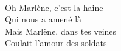 \\
Oh Marlène, c'est la haine\\
Qui nous a amené là\\
Mais Marlène, dans tes veines\\
Coulait l'amour des soldats\\
